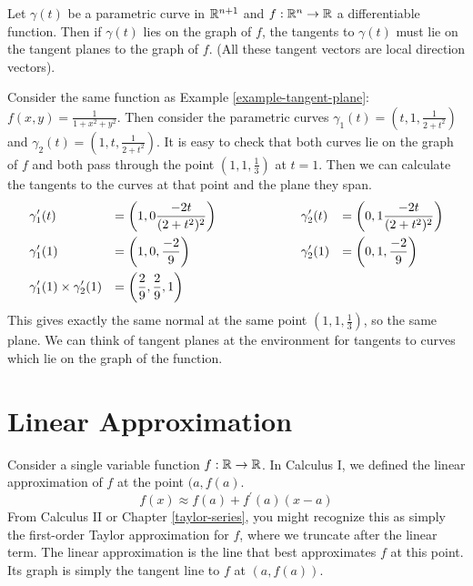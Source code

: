\documentclass[fleqn,letterpaper]{report}
\begin{document}
\begin{prop}
Let $\gamma(t)$ be a parametric curve in $\mathbb{R}^{n+1}$ and $f:
\mathbb{R}^n \rightarrow \mathbb{R}$ a differentiable function. Then if
$\gamma(t)$ lies on the graph of $f$, the tangents to
$\gamma(t)$ must lie on the tangent planes to the graph of
$f$. (All these tangent vectors are local direction vectors).
\end{prop}

\begin{example}
Consider the same function as Example
\ref{example-tangent-plane}: $f(x,y) = 
\frac{1}{1+x^2+y^2}$. Then consider the parametric curves
$\gamma_1(t) = \left(t,1, \frac{1}{2+t^2} \right)$ and 
$\gamma_2(t) = \left(1, t, \frac{1}{2+t^2} \right)$. It is
easy to check that both curves lie on the graph of $f$ and
both pass through the point $\left(1,1,\frac{1}{3} \right)$ at
$t=1$. Then we can calculate the tangents to the curves at
that point and the plane they span.
\begin{displaymath}
\begin{array}{*4{>{\displaystyle}l}}
\gamma_1^\prime(t) & = \left( 1, 0 \frac{-2t}{(2+t^2)^2}
\right) &
\hspace{2cm} \gamma_2^\prime(t) & = \left( 0, 1
\frac{-2t}{(2+t^2)^2} \right) \\[1em]
\gamma_1^\prime(1) & = \left( 1, 0, \frac{-2}{9} \right) &
\hspace{2cm} \gamma_2^\prime(1) & = \left( 0, 1, \frac{-2}{9}
\right) \\[1em]
\gamma_1^\prime(1) \times \gamma_2^\prime(1) & = \left(
\frac{2}{9}, \frac{2}{9}, 1 \right) & & 
\end{array}
\end{displaymath}
This gives exactly the same normal at the same point $\left(
1,1,\frac{1}{3} \right)$, so the same plane. We can think of
tangent planes at the environment for tangents to curves which 
lie on the graph of the function.
\end{example}

\section{Linear Approximation}
\label{linear-approximation}

Consider a single variable function $f: \mathbb{R} \rightarrow \mathbb{R}$.
In Calculus I, we defined the linear approximation
of $f$ at the point $(a,f(a)$.
\begin{equation*}
f(x) \approx f(a) + f^\prime(a) (x-a)
\end{equation*}
From Calculus II or Chapter \ref{taylor-series}, you might
recognize this as simply the first-order Taylor
approximation for $f$, where we truncate after the linear term. The
linear approximation is the line that best approximates $f$ at
this point. Its graph is simply the tangent line to $f$ at
$(a,f(a))$.
\end{document}
